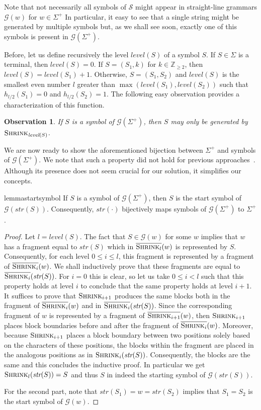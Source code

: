 \documentclass[a4paper]{article}
\newtheorem{observation}[theorem]{Observation}
\theoremstyle{remark}
\newcommand{\symbols}{\mathcal{S}}
\newcommand{\shrink}[1]{\ensuremath{\textsc{Shrink}_{#1}}}
\newcommand{\cshrink}[1]{\ensuremath{\overline{\textsc{Shrink}_{#1}}}}
\newcommand{\hs}{h}
\newcommand{\grammar}{\mathcal{G}}
\newcommand{\slev}{\textit{level}}
\newcommand{\sstr}{\textit{str}}
\begin{document}
Note that not necessarily all symbols of $\symbols$ might appear in straight-line grammars $\grammar(w)$ for $w\in \Sigma^+$
In particular, it easy to see that a single string might be generated by multiple symbols but, as we shall see soon,
exactly one of this symbols is present in $\grammar(\Sigma^+)$.

Before, let us define recursively the level $\slev(S)$ of a symbol $S$.
If $S\in \Sigma$ is a terminal, then $\slev(S)=0$. If $S=(S_1,k)$ for $k\in \mathbb{Z}_{\ge 2}$, then $\slev(S)=\slev(S_1)+1$.
Otherwise, $S=(S_1,S_2)$ and $\slev(S)$ is the smallest even number $l$ greater than $\max(\slev(S_1), \slev(S_2))$ such that $\hs_{l/2}(S_1) = 0$ and $\hs_{l/2}(S_2) = 1$. The following easy observation provides a characterization of this function.
\begin{observation}
If $S$ is a symbol of $\grammar(\Sigma^+)$, then $S$ may only be generated by $\shrink{\slev(S)}$.
\end{observation}

We are now ready to show the aforementioned bijection between $\Sigma^+$ and symbols of $\grammar(\Sigma^+)$.
We note that such a property did not hold for previous approaches~\cite{Alstrup,Mehlhorn}. Although its presence does not seem crucial for our solution, it simplifies our concepts.

\begin{restatable}{lemma}{startsymbol}\label{lem:startsymbol}
If $S$ is a symbol of $\grammar(\Sigma^+)$, then $S$ is the start symbol of $\grammar(\sstr(S))$.
Consequently, $\sstr(\cdot)$ bijectively maps symbols of $\grammar(\Sigma^+)$ to $\Sigma^+$.
\end{restatable}
\begin{proof}
Let $l=\slev(S)$.
The fact that $S\in \grammar(w)$ for some $w$ implies that $w$ has a fragment equal to $\sstr(S)$ which
in $\cshrink{l}(w)$ is represented by $S$.
Consequently, for each level $0\le i \le l$, this fragment is represented by a fragment of $\cshrink{i}(w)$.
We shall inductively prove that these fragments are equal to $\cshrink{i}(\sstr(S))$.
For $i=0$ this is clear, so let us take $0\le i < l$ such that this property holds at level $i$
to conclude that the same property holds at level $i+1$.
It suffices to prove that $\shrink{i+1}$ produces the same blocks both in the fragment of $\cshrink{i}(w)$ and in $\cshrink{i}(\sstr(S))$.
Since the corresponding fragment of $w$ is represented by a fragment of $\cshrink{i+1}(w)$, then $\shrink{i+1}$ places block boundaries
before and after the fragment of $\cshrink{i}(w)$. Moreover, because $\shrink{i+1}$ places a block boundary between two positions
solely based on the characters of these positions, the blocks within the fragment are placed in the analogous
positions as in $\shrink{i}(\sstr(S))$.
Consequently, the blocks are the same and this concludes the inductive proof.
In particular we get $\shrink{l}(\sstr(S))=S$ and thus $S$ in indeed the starting symbol of  $\grammar(\sstr(S))$.

For the second part, note that $\sstr(S_1)=w=\sstr(S_2)$ implies that $S_1=S_2$ is the start symbol of $\grammar(w)$.
\end{proof}
\end{document}
